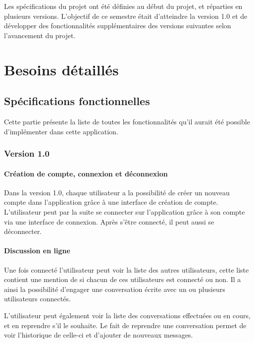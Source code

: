 Les spécifications du projet ont été définies au début du projet, et réparties en plusieurs versions. L'objectif de ce semestre était d'atteindre la version 1.0 et de développer des fonctionnalités supplémentaires des versions suivantes selon l'avancement du projet.

\section{Besoins détaillés}

\subsection{Spécifications fonctionnelles}

Cette partie présente la liste de toutes les fonctionnalités qu'il aurait été possible d'implémenter dans cette application.

\subsubsection{Version 1.0}

\paragraph{Création de compte, connexion et déconnexion\newline}

\par Dans la version 1.0, chaque utilisateur a la possibilité de créer un nouveau compte dans l’application grâce à une interface de création de compte. L’utilisateur peut par la suite se connecter sur l’application grâce à son compte via une interface de connexion. Après s'être connecté, il peut aussi se déconnecter.


\paragraph{Discussion en ligne\newline}

\par Une fois connecté l'utilisateur peut voir la liste des autres utilisateurs, cette liste contient une mention de si chacun de ces utilisateurs est connecté ou non. Il a ainsi la possibilité d’engager une conversation écrite avec un ou plusieurs utilisateurs connectés.

\par L’utilisateur peut également voir la liste des conversations effectuées ou en cours, et en reprendre s'il le souhaite. Le fait de reprendre une conversation permet de voir l’historique de celle-ci et d’ajouter de nouveaux messages.


